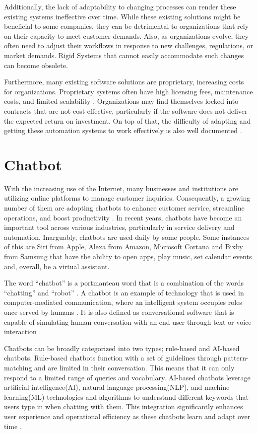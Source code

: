 Additionally, the lack of adaptability to changing processes can render these existing systems ineffective over time. While these existing solutions might be beneficial to some companies, they can be detrimental to organizations that rely on their capacity to meet customer demands\cite{akkermans2003}. Also, as organizations evolve, they often need to adjust their workflows in response to new challenges, regulations, or market demands. Rigid Systems that cannot easily accommodate such changes can become obsolete. 

Furthermore, many existing software solutions are proprietary, increasing costs for organizations. Proprietary systems often have high licensing fees, maintenance costs, and limited scalability \cite{goel2012, prasad2013}. Organizations may find themselves locked into contracts that are not cost-effective, particularly if the software does not deliver the expected return on investment. On top of that, the difficulty of adapting and getting these automation systems to work effectively is also well documented \cite{adams2011, sarker2003, scott2000}.


\section{Chatbot}
With the increasing use of the Internet, many businesses and institutions are utilizing online platforms to manage customer inquiries. Consequently, a growing number of them are adopting chatbots to enhance customer service, streamline operations, and boost productivity \cite{suta2020}. In recent years, chatbots have become an important tool across various industries, particularly in service delivery and automation. Inarguably, chatbots are used daily by some people. Some instances of this are Siri from Apple, Alexa from Amazon, Microsoft Cortana and Bixby from Samsung that have the ability to open apps, play music, set calendar events and, overall, be a virtual assistant.

The word “chatbot” is a portmanteau word that is a combination of the words “chatting” and “robot” \cite{rese2020}. A chatbot is an example of technology that is used in computer-mediated communication, where an intelligent system occupies roles once served by humans \cite{beattie2020}. It is also defined as conversational software that is capable of simulating human conversation with an end user through text or voice interaction \cite{Naruzzaman}.

Chatbots can be broadly categorized into two types; rule-based and AI-based chatbots. Rule-based chatbots function with a set of guidelines through pattern-matching and are limited in their conversation. This means that it can only respond to a limited range of queries and vocabulary. AI-based chatbots leverage artificial intelligence(AI), natural language processing(NLP), and machine learning(ML) technologies and algorithms to understand different keywords that users type in when chatting with them. This integration significantly enhances user experience and operational efficiency as these chatbots learn and adapt over time \cite{Kar2016}.

